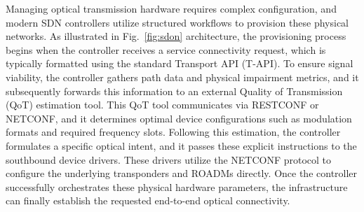 \documentclass[12pt, a4paper, twoside, openright]{report}
\begin{document}
Managing optical transmission hardware requires complex configuration, and modern SDN controllers utilize structured workflows to provision these physical networks. As illustrated in Fig.~\ref{fig:sdon} architecture, the provisioning process begins when the controller receives a service connectivity request, which is typically formatted using the standard Transport API (T-API). To ensure signal viability, the controller gathers path data and physical impairment metrics, and it subsequently forwards this information to an external Quality of Transmission (QoT) estimation tool. This QoT tool communicates via RESTCONF or NETCONF, and it determines optimal device configurations such as modulation formats and required frequency slots. Following this estimation, the controller formulates a specific optical intent, and it passes these explicit instructions to the southbound device drivers. These drivers utilize the NETCONF protocol to configure the underlying transponders and ROADMs directly. Once the controller successfully orchestrates these physical hardware parameters, the infrastructure can finally establish the requested end-to-end optical connectivity.
\end{document}
